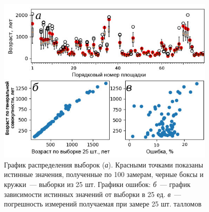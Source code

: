 \begin{figure}[H]
  \begin{center}
    \includegraphics[width=0.95\textwidth]{authors/kolegov-fig2.jpg}
  \end{center}
  \vspace{-0.5cm}
  \caption{График распределения выборок (\textit{а}). Красными точками показаны истинные значения,
полученные по 100 замерам, черные боксы и кружки~--- выборки из 25 шт. Графики ошибок: \textit{б}~--- график зависимости истинных значений от выборки в 25 ед. \textit{в}~--- погрешность измерений получаемая при замере 25 шт. талломов}
  \label{fig:kolegov}
\end{figure}
